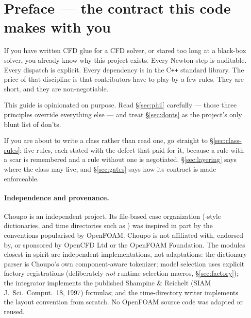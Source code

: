 \documentclass[11pt,a4paper]{article}
\begin{document}

\setcounter{tocdepth}{2}
\tableofcontents
\clearpage
{}
\setcounter{page}{1}

\section*{Preface --- the contract this code makes with you}

If you have written CFD glue for a CFD solver, or stared too long at a
black-box solver, you already know why this project exists.
Every Newton step is auditable. Every dispatch is explicit. Every
dependency is in the C\texttt{++} standard library. The price of that
discipline is that contributors have to play by a few rules. They are
short, and they are non-negotiable.

This guide is opinionated on purpose. Read \S\ref{sec:phil} carefully
--- those three principles override everything else --- and treat
\S\ref{sec:donts} as the project's only blunt list of don'ts.

If you are about to write a class rather than read one, go straight to
\S\ref{sec:class-rules}: five rules, each stated with the defect that paid for
it, because a rule with a scar is remembered and a rule without one is
negotiated. \S\ref{sec:layering} says where the class may live, and
\S\ref{sec:gates} says how its contract is made enforceable.

\paragraph{Independence and provenance.}  Choupo is an independent
project.  Its file-based case organization (-style
dictionaries,  and time directories such as )
was inspired in part by the conventions popularised by OpenFOAM.  Choupo
is not affiliated with, endorsed by, or sponsored by OpenCFD Ltd or the
OpenFOAM Foundation.  The modules closest in spirit are independent
implementations, not adaptations: the dictionary parser is Choupo's own
component-aware tokenizer; model selection uses explicit factory
registrations (deliberately \emph{not} runtime-selection macros,
\S\ref{sec:factory}); the  integrator implements the
published Shampine \& Reichelt (SIAM J.\ Sci.\ Comput.\ 18, 1997)
formulas; and the time-directory writer implements the layout convention
from scratch.  No OpenFOAM source code was adapted or reused.
\end{document}
